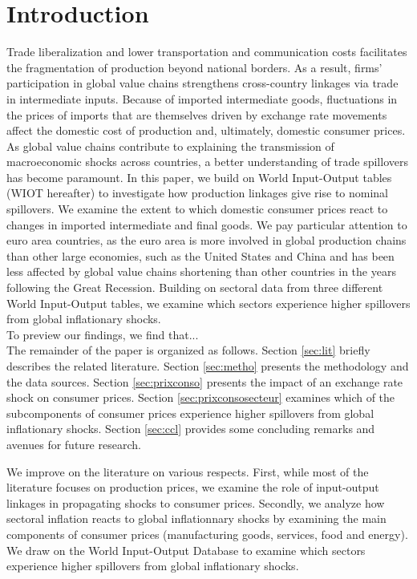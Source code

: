 \documentclass[11pt,a4paper]{article}
\begin{document}
\section{Introduction}
Trade liberalization and lower transportation and communication costs facilitates the fragmentation of production beyond national borders.
As a result, firms' participation in global value chains strengthens cross-country linkages via trade in intermediate inputs. 
Because of imported intermediate goods, fluctuations in the prices of imports that are themselves driven by exchange rate movements affect the domestic cost of production and, ultimately, domestic consumer prices. 
As global value chains contribute to explaining the transmission of macroeconomic shocks across countries, a better understanding of trade spillovers has become paramount.  
In this paper, we build on World Input-Output tables (WIOT hereafter) to investigate how production linkages give rise to nominal spillovers. 
We examine the extent to which domestic consumer prices react to changes in imported intermediate and final goods.
We pay particular attention to euro area countries, as the euro area is more involved in global production chains than other large economies, such as the United States and China \citep{ECB2016} and has been less affected by global value chains shortening than other countries in the years following the Great Recession. 
Building on sectoral data from three different World Input-Output tables, we examine which sectors experience higher spillovers from global inflationary shocks.\\
To preview our findings, we find that...\\
The remainder of the paper is organized as follows. Section \ref{sec:lit} briefly describes the related literature. Section \ref{sec:metho} presents the methodology and the data sources.  Section \ref{sec:prixconso} presents the impact of an exchange rate shock on consumer prices.  Section \ref{sec:prixconsosecteur} examines which of the subcomponents of consumer prices experience higher spillovers from global inflationary shocks.
Section \ref{sec:ccl} provides some concluding remarks and avenues for future research.




We improve on the literature on various respects. First, while most of the literature focuses on production prices, we examine the role of input-output linkages in propagating shocks to consumer prices. 
Secondly, we analyze how sectoral inflation reacts to global inflationnary shocks by examining the main components of consumer prices (manufacturing goods, services, food and energy).  We draw on the World Input-Output Database to examine which sectors experience higher spillovers from global inflationary shocks.
\end{document}
